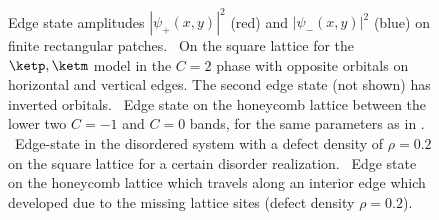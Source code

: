 \begin{figure}[p]
    \centering
    \hspace{1.5cm}
     \\
    \vspace{1cm}
    \hspace{1.5cm}
    \vspace{1cm}
    \caption{Edge state amplitudes $|\psi_+(x,y)|^2$ (red) and $|\psi_-(x,y)|^2$ (blue) on finite rectangular patches. \sfA~On the square lattice for the $\ketp, \ketm$ model in the $C=2$ phase with opposite orbitals on horizontal and vertical edges. The second edge state (not shown) has inverted orbitals. \sfB~Edge state on the honeycomb lattice between the lower two $C=-1$ and $C=0$ bands, for the same parameters as in . \sfC~Edge-state in the disordered system with a defect density of $\rho= 0.2$ on the square lattice for a certain disorder realization. \sfD~Edge state on the honeycomb lattice which travels along an interior edge which developed due to the missing lattice sites (defect density $\rho=0.2$).}
\end{figure}

